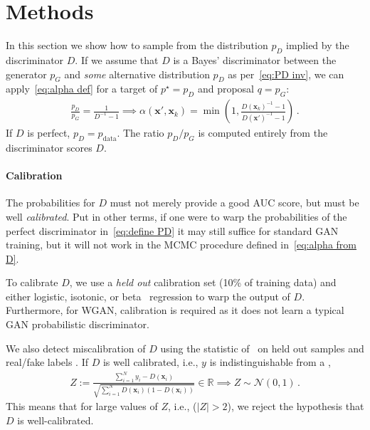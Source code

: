 \documentclass{article}
\renewcommand{\vec}[1]{{\boldsymbol{\mathbf{#1}}}} %
\newcommand{\R}{\mathbb{R}}
\newcommand{\sample}{\sim}
\newcommand{\norm}{\mathcal{N}}
\newcommand{\bern}{\textrm{Bern}}
\newcommand{\target}{{p^\star}}
\newcommand{\prop}{q}
\newcommand{\PG}{{p_G}}
\newcommand{\PD}{{p_D}}
\newcommand{\PR}{{p_{\textrm{data}}}}
\newcommand{\accept}{\alpha}
\begin{document}
\section{Methods}
\label{sec:Methods}

In this section we show how to sample from the distribution $\PD$ implied by the discriminator $D$.
If we assume that $D$ is a Bayes' discriminator between the generator $\PG$ and \emph{some} alternative distribution $\PD$ as per~\eqref{eq:PD inv}, we can apply~\eqref{eq:alpha def} for a target of $\target=\PD$ and proposal $\prop=\PG$:
\begin{align}
  \frac{\PD}{\PG} = \frac{1}{D^{-1} - 1} \implies
  \accept(\vec x', \vec x_k) = \min\left(1, \frac{D(\vec x_k)^{-1} - 1}{D(\vec x')^{-1} - 1}\right)\,. \label{eq:alpha from D}
\end{align}
If $D$ is perfect, $\PD = \PR$.
The ratio $\PD/\PG$ is computed entirely from the discriminator scores $D$.

\paragraph{Calibration}
The probabilities for $D$ must not merely provide a good AUC score, but must be well \emph{calibrated}.
Put in other terms, if one were to warp the probabilities of the perfect discriminator in~\eqref{eq:define PD} it may still suffice for standard GAN training, but it will not work in the MCMC procedure defined in~\eqref{eq:alpha from D}.

To calibrate $D$, we use a \emph{held out} calibration set (10\% of training data) and either logistic, isotonic, or beta~\citep{Kull2017} regression to warp the output of $D$.
Furthermore, for WGAN, calibration is required as it does not learn a typical GAN probabilistic discriminator.

We also detect miscalibration of $D$ using the statistic of~\citet{Dawid1997} on held out samples \smash{$\vec x_{1:N}$} and real/fake labels .
If $D$ is well calibrated, i.e., $y$ is indistinguishable from a \smash{$y \sample \bern(D(\vec x))$},
\begin{align}
  Z := \frac{\sum_{i=1}^N y_i - D(\vec x_i)}{\sqrt{\sum_{i=1}^N D(\vec x_i) (1 - D(\vec x_i))}} \in \R \implies Z \sample \norm(0,1)\,.
  \label{eq:calib score}
\end{align}
This means that for large values of $Z$, i.e., ($|Z| > 2$), we reject the hypothesis that $D$ is well-calibrated.
\end{document}
